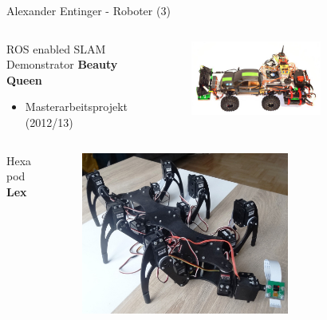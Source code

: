 \documentclass{beamer}
\begin{document}
\begin{frame}{Alexander Entinger - Roboter (3)}
\begin{columns}
 \begin{column}{0.5\textwidth}
  \begin{large}ROS enabled SLAM Demonstrator \textbf{Beauty Queen}\end{large}
  \begin{itemize}
   \item Masterarbeitsprojekt (2012/13)
  \end{itemize}
 \end{column}
 \begin{column}{0.5\textwidth}
 \begin{figure}[H]
  \centering
  \includegraphics[width=0.7\textwidth]{./images/robot-beauty-queen.jpg}
  \label{fig:robot-beauty-queen}
 \end{figure}
\end{column}
\end{columns}
	
\begin{columns}
 \begin{column}{0.5\textwidth}
  \begin{large}Hexapod \textbf{Lex}\end{large}
 \end{column}
 \begin{column}{0.5\textwidth}
  \begin{figure}[H]
   \centering
   \includegraphics[width=0.7\textwidth]{./images/robot-lex.jpg}
   \label{fig:robot-lex}
  \end{figure}
 \end{column}
\end{columns}

\end{frame}
\end{document}
